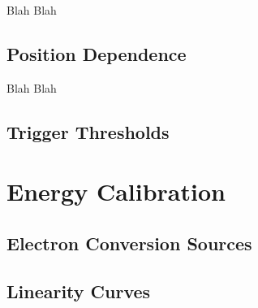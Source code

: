 Blah Blah

\subsection{Position Dependence}

Blah Blah

\subsection{Trigger Thresholds}

\section{Energy Calibration}
\subsection{Electron Conversion Sources}
\subsection{Linearity Curves}








